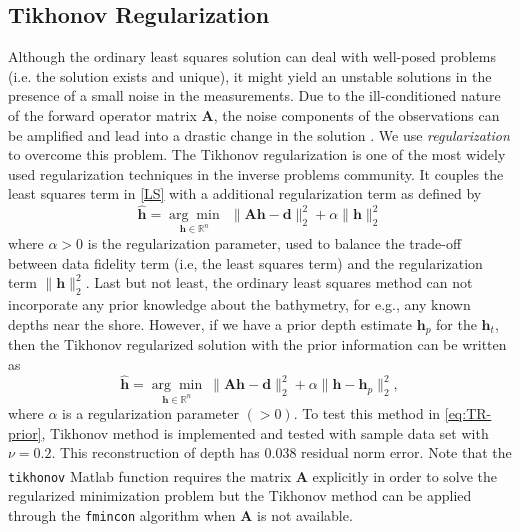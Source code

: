 \subsection{ Tikhonov Regularization}\label{TikRegMethod}

Although the ordinary least squares solution can deal with well-posed problems (i.e. the solution exists and unique), it might yield an unstable solutions in the presence of a small noise in the measurements. Due to the ill-conditioned nature of the forward operator matrix $\mathbf{A}$, the noise components of the observations can be amplified and lead into a drastic change in the solution \cite{Tuys2014}. We use \textit{regularization} to overcome this problem. The Tikhonov regularization is one of the most widely used regularization techniques in the inverse problems community. It couples the least squares term in \eqref{LS} with a additional regularization term as defined by 
\begin{equation}\label{eq:TR}
\mathbf{\hat{h}} = \underset{\mathbf{h} \in \mathbb{R}^n}{\arg \min} \ \ \|  \mathbf{A}\mathbf{h} -  \mathbf{d} \|_2^2  +  \alpha \| \mathbf{h}\|_2^2
\end{equation}
where $\alpha > 0$ is the regularization parameter, used to balance the trade-off between data fidelity term (i.e, the least squares term) and the regularization term $\| \mathbf{h}\|_2^2$. %
Last but not least, the ordinary least squares method can not incorporate any prior knowledge about the bathymetry, for e.g., any known depths near the shore. However, if we have a prior depth estimate $\mathbf{h}_p$ for the $\mathbf{h}_t$, then the Tikhonov regularized solution with the prior information can be written as
\begin{equation}\label{eq:TR-prior}
\mathbf{\hat{h}} = \underset{\mathbf{h} \in \mathbb{R}^n}{\arg \min} \  \|  \mathbf{A}\mathbf{h} -  \mathbf{d} \|_2^2  +  \alpha \| \mathbf{h} -  \mathbf{h}_p\|_2^2,
\end{equation}
where $\alpha$ is a regularization parameter $(>0)$. To test this method in \eqref{eq:TR-prior}, Tikhonov method is implemented and tested with sample data set with $\nu = 0.2$. This reconstruction of depth has 0.038 residual norm error. Note that the \verb|tikhonov| Matlab\textsuperscript{\textregistered} function requires the matrix $\mathbf{A}$ explicitly in order to solve the regularized minimization problem but the Tikhonov method can be applied through the \verb|fmincon| algorithm when $\mathbf{A}$ is not available. 

